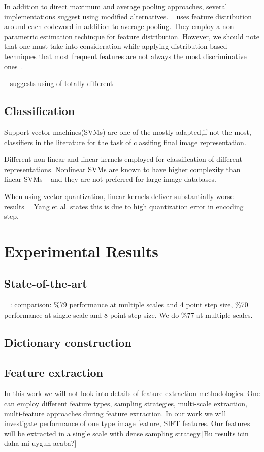 \documentclass[conference]{IEEEtran}
\begin{document}
In addition to direct maximum and average pooling approaches, several implementations suggest using modified alternatives. ~\cite{Avila2013453} uses feature distribution around each codeword in addition to average pooling. They employ a non-parametric estimation techinque for feature distribution. However, we should note that one must take into consideration while applying distribution based techniques that most frequent features are not always the most discriminative ones~\cite{5128909}.


~\cite{McCannL12} suggests using of totally different 

\subsection {Classification}

Support vector machines(SVMs) are one of the mostly adapted,if not the most, classifiers in the literature for the task of classifing final image representation. 

Different non-linear and linear kernels employed for classification of different representations. Nonlinear SVMs are known to have higher complexity than linear SVMs ~\cite{5206757} and they are not preferred for large image databases.

When using vector quantization, linear kernels deliver substantially worse results~\cite{1641019}~\cite{5539963} Yang et al. states this is due to high quantization error in encoding step.

\section {Experimental Results}

\subsection {State-of-the-art}

~\cite{SecondOrderPooling} : comparison: \%79 performance at multiple scales and 4 point step size, \%70 performance at single scale and 8 point step size. We do \%77 at multiple scales.

\subsection {Dictionary construction}
\subsection {Feature extraction}
In this work we will not look into details of feature extraction methodologies. One can employ different feature types, sampling strategies, multi-scale extraction, multi-feature approaches during feature extraction. In our work we will investigate performance of one type image feature, SIFT features. Our features will be extracted in a single scale with dense sampling strategy.[Bu results icin daha mi uygun acaba?]
\end{document}

